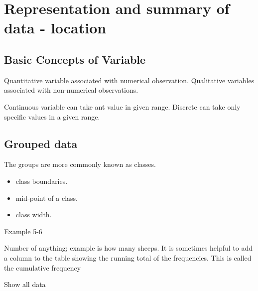 \documentclass[a4paper]{article}
\begin{document}
\maketitle


\tableofcontents

\section{Representation and summary of data - location}
\subsection{Basic Concepts of Variable}
\begin{defi}
	Quantitative variable associated with numerical observation. Qualitative variables associated with non-numerical observations.
\end{defi}

\begin{defi}
	Continuous variable can take ant value in given range. Discrete can take only specific values in a given range.
\end{defi}


\subsection{Grouped data}
\begin{defi}
	The groups are more commonly known as classes.
	\begin{itemize}
		\item class boundaries.
		\item mid-point of a class.
		\item class width.
	\end{itemize}
\end{defi}

\begin{eg}
	Example 5-6
\end{eg}

\begin{defi}
	Number of anything; example is how many sheeps.
	It is sometimes helpful to add a column to the table showing the running total of the frequencies. This is called the cumulative frequency
\end{defi}


\begin{defi}
	Show all data
\end{defi}
\end{document}
